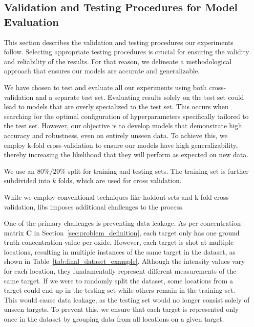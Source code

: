 \subsection{Validation and Testing Procedures for Model Evaluation}\label{subsec:validation_testing_procedures}
This section describes the validation and testing procedures our experiments follow.
Selecting appropriate testing procedures is crucial for ensuring the validity and reliability of the results.
For that reason, we delineate a methodological approach that ensures our models are accurate and generalizable.

We have chosen to test and evaluate all our experiments using both cross-validation and a separate test set.
Evaluating results solely on the test set could lead to models that are overly specialized to the test set.
This occurs when searching for the optimal configuration of hyperparameters specifically tailored to the test set.
However, our objective is to develop models that demonstrate high accuracy and robustness, even on entirely unseen data.
To achieve this, we employ k-fold cross-validation to ensure our models have high generalizability, thereby increasing the likelihood that they will perform as expected on new data.

We use an $80\%/20\%$ split for training and testing sets. The training set is further subdivided into $k$ folds, which are used for cross validation.

While we employ conventional techniques like holdout sets and k-fold cross validation, \gls{libs} imposes additional challenges to the process.

One of the primary challenges is preventing data leakage.
As per concentration matrix $\mathbf{C}$ in Section~\ref{sec:problem_definition}, each target only has one ground truth concentration value per oxide.
However, each target is shot at multiple locations, resulting in multiple instances of the same target in the dataset, as shown in Table~\ref{tab:final_dataset_example}.
Although the intensity values vary for each location, they fundamentally represent different measurements of the same target.
If we were to randomly split the dataset, some locations from a target could end up in the testing set while others remain in the training set.
This would cause data leakage, as the testing set would no longer consist solely of unseen targets.
To prevent this, we ensure that each target is represented only once in the dataset by grouping data from all locations on a given target.

